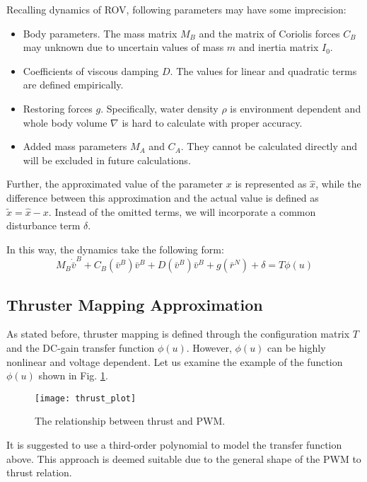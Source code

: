     Recalling dynamics of ROV, following parameters may have some imprecision:
    \begin{itemize}
        \item Body parameters. The mass matrix $M_B$ and the matrix of Coriolis forces $C_B$ 
        may unknown due to uncertain values of mass $m$ and inertia matrix $I_0$.
        \item Coefficients of viscous damping $D$. The values for linear and quadratic 
        terms are defined empirically.
        \item Restoring forces $g$. Specifically, water density $\rho$ is environment dependent 
        and whole body volume $\nabla$ is hard to calculate with proper accuracy.
        \item Added mass parameters $M_A$ and $C_A$. They cannot be calculated directly and will 
        be excluded in future calculations.
    \end{itemize}
    Further, the approximated value of the parameter $x$ is represented as $\hat x$,
    while the difference between this approximation and the actual value is 
    defined as $\tilde x = \hat x - x$. Instead of the omitted terms, we will incorporate a common disturbance 
    term $\delta$.

    In this way, the dynamics take the following form:
    \begin{equation}
        M_B \dot{\bar{v}}^B + C_B(\bar{v}^B) \bar{v}^B+D(\bar{v}^B) \bar{v}^B+g(\bar{r}^N)
            + \delta = T\phi(u)
    \end{equation}

\subsection{Thruster Mapping Approximation}
    As stated before, thruster mapping is defined through the configuration 
    matrix $T$ and the DC-gain transfer function $\phi(u)$. However, $\phi(u)$ 
    can be highly nonlinear and voltage dependent. 
    Let us examine the example of the function $\phi(u)$ shown in Fig. \ref{image:thrust}.
    \begin{figure}[H]
        \centering\texttt{[image: thrust\_plot]}
        \caption{The relationship between thrust and PWM.}
        \label{image:thrust}
    \end{figure}
    It is suggested to use a third-order polynomial to model the transfer function above. 
    This approach is deemed suitable due to the general shape of the PWM to thrust relation.
    
